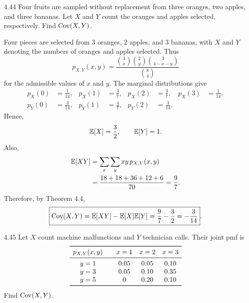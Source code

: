 \documentclass[11pt,oneside]{article}
\begin{document}
\begin{exercise}{4.44}
Four fruits are sampled without replacement from three oranges, two apples, and three bananas. Let $X$ and $Y$ count the oranges and apples selected, respectively. Find $\operatorname{Cov}(X,Y)$.
\end{exercise}

\begin{solution}
Four pieces are selected from $3$ oranges, $2$ apples, and $3$ bananas, with $X$ and $Y$ denoting the numbers of oranges and apples selected. Thus
\[
    p_{X,Y}(x,y)
    =\frac{\binom{3}{x}\binom{2}{y}\binom{3}{4-x-y}}{\binom{8}{4}}
\]
for the admissible values of $x$ and $y$. The marginal distributions give
\[
\begin{aligned}
    p_X(0)&=\frac1{14}, & p_X(1)&=\frac37,
    & p_X(2)&=\frac37, & p_X(3)&=\frac1{14},\\
    p_Y(0)&=\frac3{14}, & p_Y(1)&=\frac47,
    & p_Y(2)&=\frac3{14}.
\end{aligned}
\]
Hence,
\[
    \mathbb{E}[X]=\frac32,
    \qquad
    \mathbb{E}[Y]=1.
\]
Also,
\[
\begin{aligned}
    \mathbb{E}[XY]
    &=\sum_x\sum_y xy\,p_{X,Y}(x,y)\\
    &=\frac{18+18+36+12+6}{70}
      =\frac97.
\end{aligned}
\]
Therefore, by Theorem 4.4,
\[
    \boxed{\operatorname{Cov}(X,Y)
    =\mathbb{E}[XY]-\mathbb{E}[X]\mathbb{E}[Y]
    =\frac97-\frac32
    =-\frac3{14}}.
\]
\end{solution}

\begin{exercise}{4.45}
Let $X$ count machine malfunctions and $Y$ technician calls. Their joint pmf is
\[
\begin{array}{c@{\qquad}ccc}\toprule p_{X,Y}(x,y)&x=1&x=2&x=3\\\midrule y=1&0.05&0.05&0.10\\ y=3&0.05&0.10&0.35\\ y=5&0&0.20&0.10\\\bottomrule\end{array}
\]
Find $\operatorname{Cov}(X,Y)$.
\end{exercise}
\end{document}
